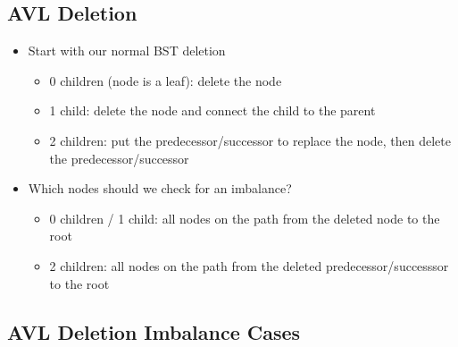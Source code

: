 \documentclass[
  10pt,
  english,
  letterpaper,
,tablecaptionabove
]{scrartcl}
\providecommand{\tightlist}{%
  \setlength{\itemsep}{0pt}\setlength{\parskip}{0pt}}
\begin{document}
\hypertarget{avl-deletion}{%
\subsection{AVL Deletion}\label{avl-deletion}}

\begin{itemize}
\tightlist
\item
  Start with our normal BST deletion

  \begin{itemize}
  \tightlist
  \item
    0 children (node is a leaf): delete the node
  \item
    1 child: delete the node and connect the child to the parent
  \item
    2 children: put the predecessor/successor to replace the node, then
    delete the predecessor/successor
  \end{itemize}
\item
  Which nodes should we check for an imbalance?

  \begin{itemize}
  \tightlist
  \item
    0 children / 1 child: all nodes on the path from the deleted node to
    the root
  \item
    2 children: all nodes on the path from the deleted
    predecessor/successsor to the root
  \end{itemize}
\end{itemize}

\hypertarget{avl-deletion-imbalance-cases}{%
\subsection{AVL Deletion Imbalance
Cases}\label{avl-deletion-imbalance-cases}}
\end{document}
